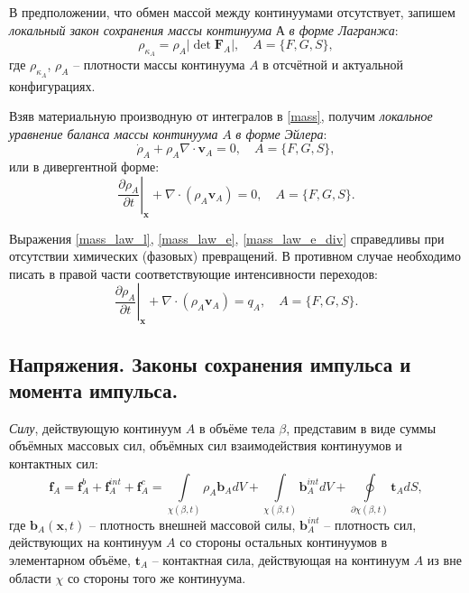 	В предположении, что обмен массой между континуумами отсутствует, запишем \textit{локальный закон сохранения массы континуума} $А$ \textit{в форме Лагранжа}:
\begin{equation}
	\label{mass_law_l}
	\rho_{\kappa_A} = \rho_A \left|\det \boldsymbol{F}_A\right|, \quad A=\{F, G, S\},
\end{equation}
	где $\rho_{\kappa_A}$, $\rho_A$ -- плотности массы континуума $A$ в отсчётной и актуальной конфигурациях.
	
	Взяв материальную производную от интегралов в \eqref{mass}, получим \textit{локальное уравнение баланса массы континуума} $A$ \textit{в форме Эйлера}:
\begin{equation}
	\label{mass_law_e}
	\dot{\rho}_A + \rho_A \nabla \cdot \boldsymbol{v}_A = 0, \quad A=\{F, G, S\},
\end{equation}
	или в дивергентной форме:
\begin{equation}
	\label{mass_law_e_div}
	\left.\frac{\partial \rho_A}{\partial t}\right|_{\boldsymbol{x}} + \nabla \cdot \left(\rho_A \boldsymbol{v}_A\right) = 0, \quad A=\{F, G, S\}.
\end{equation}
	
	Выражения \eqref{mass_law_l}, \eqref{mass_law_e}, \eqref{mass_law_e_div} справедливы при отсутствии химических (фазовых) превращений. В противном случае необходимо писать в правой части соответствующие интенсивности переходов:
\begin{equation}
	\label{mass_law_e_div1}
	\left.\frac{\partial \rho_A}{\partial t}\right|_{\boldsymbol{x}} + \nabla \cdot \left(\rho_A \boldsymbol{v}_A\right) = q_A, \quad A=\{F, G, S\}.
\end{equation}

\subsection{Напряжения. Законы сохранения импульса и момента импульса.}
	\textit{Силу}, действующую континуум $A$ в объёме тела $\beta$, представим в виде суммы объёмных массовых сил, объёмных сил взаимодействия континуумов и контактных сил:
\begin{equation}
	\label{force_A}
	\boldsymbol{f}_A = \boldsymbol{f}_A^b + \boldsymbol{f}_A^{int} + \boldsymbol{f}_A^c = \int\limits_{\chi({\beta}, t)}\rho_A \boldsymbol{b}_A dV + \int\limits_{\chi({\beta}, t)}\boldsymbol{b}_A^{int} dV + \oint\limits_{\partial\chi({\beta}, t)}\boldsymbol{t}_A dS,
\end{equation}
	где $\boldsymbol{b}_A(\boldsymbol{x}, t)$ -- плотность внешней массовой силы,
	$\boldsymbol{b}_A^{int}$ -- плотность сил, действующих на континуум $A$ со стороны остальных континуумов в элементарном объёме,
	$\boldsymbol{t}_A$ -- контактная сила, действующая на континуум $A$ из вне области $\chi$ со стороны того же континуума.

